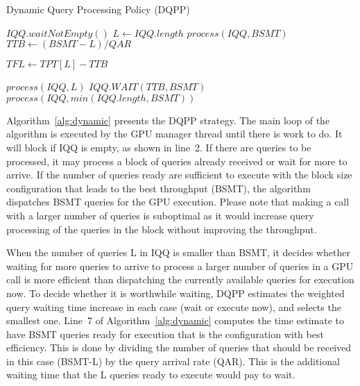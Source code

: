 \begin{algorithm}[H]
\caption{Dynamic Query Processing Policy (DQPP)}
\begin{algorithmic}[1]
    \State $IQQ.waitNotEmpty()$
    \State $L \gets IQQ.length$
        \State $process(IQQ, BSMT)$
    \Else
        \State $TTB \gets (BSMT - L) / QAR$
        
        \State $TFL \gets TPT[L] - TTB$
        
    	    \State $process(IQQ, L)$
    	\Else 
    	    \State $IQQ.WAIT(TTB, BSMT)$
    	    \State $process(IQQ, min(IQQ.length, BSMT))$
    	\EndIf
    \EndIf
\EndWhile
\end{algorithmic}
\label{alg:dynamic}
\end{algorithm}

Algorithm~\ref{alg:dynamic} presents the DQPP strategy. The main loop of the algorithm 
is executed by the GPU manager 
thread until there is work to do. It will block if IQQ is empty, as shown in line~2. If
there are queries to be processed, it may process a block of queries already received or wait for 
more to arrive. If the number of queries ready are sufficient to execute with the block 
size configuration that leads to the best throughput (BSMT), the algorithm dispatches BSMT queries 
for the GPU execution. Please note that making a call with a larger number of queries is
suboptimal as it would increase query processing of the queries in the block without
improving the throughput.

When the number of queries L in IQQ is smaller than BSMT, it 
decides whether waiting for more queries to
arrive to process a larger number of queries in a GPU call is more efficient than dispatching
the currently available queries for execution now. 
To decide whether it is worthwhile waiting, DQPP estimates the
weighted query waiting time increase in each case (wait or execute now), and selects
the smallest one. Line~7 of Algorithm~\ref{alg:dynamic} computes the time estimate to have
BSMT queries ready for execution that is the configuration with best efficiency. This is done
by dividing the number of queries that should be received in this case (BSMT-L) by the query 
arrival rate (QAR). This is the additional waiting time that the L queries ready to execute would 
pay to wait.

